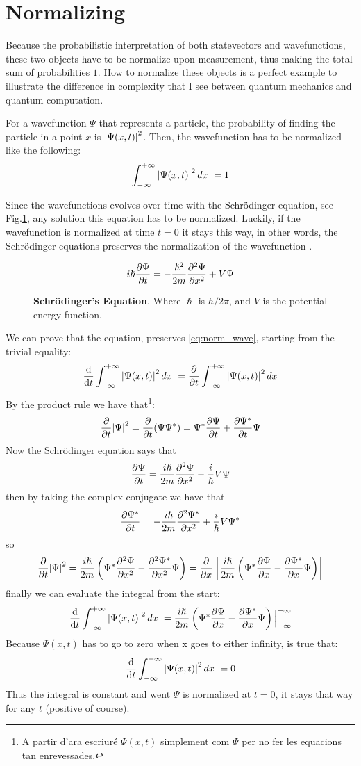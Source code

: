 \section{Normalizing}
Because the probabilistic interpretation of both statevectors and wavefunctions, these two objects have to be normalize upon measurement, thus making the total sum of probabilities $1$. How to normalize these objects is a perfect example to illustrate the difference in complexity that I see between quantum mechanics and quantum computation. 

 For a wavefunction $\Psi$ that represents a particle, the probability of finding the particle in a point $x$ is $\abs{\Psi(x,t)}^2$. Then, the wavefunction has to be normalized like the following:
\begin{equation}
\int_{-\infty}^{+\infty}\abs{\Psi(x,t)}^2\, dx\ = 1
\label{eq:norm_wave}
\end{equation}

Since the wavefunctions evolves over time with the Schrödinger equation, see Fig.\ref{fig:schro}, any solution this equation has to be normalized. Luckily, if the wavefunction is normalized at time $t=0$ it stays this way, in other words, the Schrödinger equations preserves the normalization of the wavefunction \cite{IntroQM:normalizing}. 

\begin{figure}
	$$
	i\hslash \pdv{\Psi}{t} = -\frac{\hslash^2}{2m}\pdv[2]{\Psi}{x}+V\Psi
	$$
	\caption{\textbf{Schrödinger's Equation}. Where $\hslash$ is $h/2\pi$, and $V$ is the potential energy function.}
	\label{fig:schro}
\end{figure}

We can prove that the equation, preserves \ref{eq:norm_wave}, starting from the trivial equality:
$$
\dv{t} \int_{-\infty}^{+\infty}\abs{\Psi(x,t)}^2\, dx\ = \pdv{t} \int_{-\infty}^{+\infty}\abs{\Psi(x,t)}^2\, dx
$$
By the product rule we have that\footnote{A partir d'ara escriuré  $\Psi(x,t)$ simplement com $\Psi$ per no fer les equacions tan enrevessades.}:
$$
\pdv{t}\abs{\Psi}^2 = \pdv{t}(\Psi\Psi^*) = \Psi^*\pdv{\Psi}{t} + \pdv{\Psi^*}{t}\Psi
$$
Now the Schrödinger equation says that 
$$
\pdv{\Psi}{t} = \frac{i\hslash}{2m}\pdv[2]{\Psi}{x} -  \frac{i}{\hslash}V\Psi
$$
then by taking the complex conjugate we have that 
$$
\pdv{\Psi^*}{t} = - \frac{i\hslash}{2m}\pdv[2]{\Psi^*}{x} + \frac{i}{\hslash}V\Psi^*
$$
so
$$
\pdv{t}\abs{\Psi}^2 = \frac{i\hslash}{2m} \left( \Psi^*\pdv[2]{\Psi}{x} - \pdv[2]{\Psi^*}{x}\Psi \right) = \pdv{x} \left[ \frac{i\hslash}{2m} \left(\Psi^*\pdv{\Psi}{x} - \pdv{\Psi^*}{x}\Psi\right)\right]
$$
finally we can evaluate the integral from the start:
$$
\dv{t} \int_{-\infty}^{+\infty}\abs{\Psi(x,t)}^2\, dx\ = \frac{i\hslash}{2m} \left( \Psi^*\pdv{\Psi}{x} - \pdv{\Psi^*}{x}\Psi \right) \Big|_{-\infty}^{+\infty}
$$
Because $\Psi(x,t)$ has to go to zero when x goes to either infinity, is true that:
$$
\dv{t} \int_{-\infty}^{+\infty}\abs{\Psi(x,t)}^2\, dx\ = 0
$$
Thus the integral is constant and went $\Psi$ is normalized at $t=0$, it stays that way for any $t$ (positive of course). 

